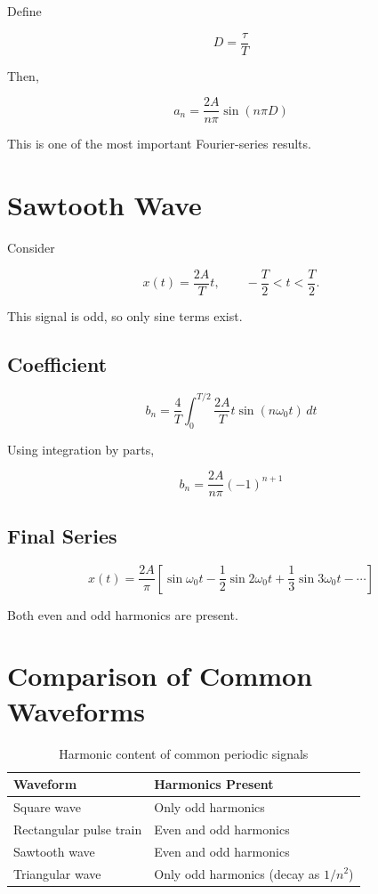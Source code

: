 Define

\[
\boxed{
D=\frac{\tau}{T}
}
\]

Then,

\[
\boxed{
a_n=
\frac{2A}{n\pi}\sin(n\pi D)
}
\]

This is one of the most important Fourier-series results.


\section{Sawtooth Wave}

Consider

\[
x(t)=\frac{2A}{T}t,
\qquad
-\frac{T}{2}<t<\frac{T}{2}.
\]

This signal is odd, so only sine terms exist.


\subsection{Coefficient}

\[
b_n=
\frac{4}{T}
\int_0^{T/2}
\frac{2A}{T}t\sin(n\omega_0 t)\,dt
\]

Using integration by parts,

\[
\boxed{
b_n=
\frac{2A}{n\pi}(-1)^{n+1}
}
\]


\subsection{Final Series}

\[
\boxed{
x(t)=
\frac{2A}{\pi}
\left[
\sin\omega_0 t
-\frac{1}{2}\sin2\omega_0 t
+\frac{1}{3}\sin3\omega_0 t
-\cdots
\right]
}
\]

Both even and odd harmonics are present.


\section{Comparison of Common Waveforms}

\begin{table}[H]
\centering
\caption{Harmonic content of common periodic signals}
\begin{tabular}{|p{4cm}|p{6cm}|}
\hline
\textbf{Waveform} & \textbf{Harmonics Present} \\
\hline
Square wave & Only odd harmonics \\
\hline
Rectangular pulse train & Even and odd harmonics \\
\hline
Sawtooth wave & Even and odd harmonics \\
\hline
Triangular wave & Only odd harmonics (decay as \(1/n^2\)) \\
\hline
\end{tabular}
\end{table}

